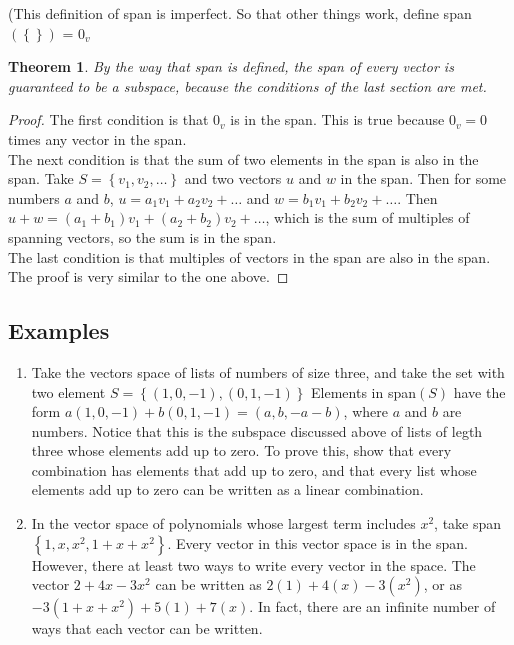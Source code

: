 \documentclass{article}
\newtheorem*{theorem}{Theorem}
\begin{document}
    (This definition of span is imperfect. So that other things work, define span$(\left\{\right\})$ = $0_v$
    \begin{theorem}
        By the way that span is defined, the span of every vector is guaranteed to be a subspace, because the conditions of the last section are met.
    \end{theorem}
    \begin{proof}
        The first condition is that $0_v$ is in the span. This is true because $0_v = 0$ times any vector in the span.\\
        The next condition is that the sum of two elements in the span is also in the span.
        Take $S = \left\{v_1, v_2, \dots\right\}$ and two vectors $u$ and $w$ in the span.
        Then for some numbers $a$ and $b$, $u = a_1 v_1 + a_2 v_2 + \dots$ and $w = b_1 v_1 + b_2 v_2 + \dots$. Then $u + w = (a_1 + b_1) v_1 + (a_2 + b_2) v_2 + \dots$, which is the sum of multiples of spanning vectors, so the sum is in the span.\\
        The last condition is that multiples of vectors in the span are also in the span. The proof is very similar to the one above.
    \end{proof}
    \subsection{Examples}
        \begin{enumerate}
            \item
                Take the vectors space of lists of numbers of size three, and take the set with two element $S = \left\{(1, 0, -1), (0,1,-1)\right\}$
                Elements in span$(S)$ have the form $a(1, 0, -1) + b(0, 1, -1) = (a, b, -a-b)$, where $a$ and $b$  are numbers. Notice that this is the subspace discussed above of lists of legth three whose elements add up to zero. To prove this, show that every combination has elements that add up to zero, and that every list whose elements add up to zero can be written as a linear combination.
            \item 
                In the vector space of polynomials whose largest term includes $x^2$, take span$\left\{1, x, x^2, 1+x+x^2 \right\}$. Every vector in this vector space is in the span. However, there at least two ways to write every vector in the space. The vector $2 + 4x - 3x^2$ can be written as $2(1) + 4(x) - 3(x^2)$, or as $-3(1+x+x^2) + 5(1) + 7(x)$. In fact, there are an infinite number of ways that each vector can be written.
        \end{enumerate}
\end{document}
